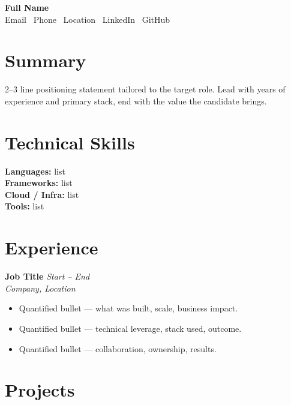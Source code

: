 \documentclass[10pt,letterpaper]{article}
\begin{document}
\begin{center}
  {\LARGE \textbf{Full Name}}\\[3pt]
  {\small Email \textbar\ Phone \textbar\ Location \textbar\ LinkedIn \textbar\ GitHub}
\end{center}

\vspace{2pt}

\section*{Summary}
2--3 line positioning statement tailored to the target role. Lead with years
of experience and primary stack, end with the value the candidate brings.

\section*{Technical Skills}
\textbf{Languages:} list \\
\textbf{Frameworks:} list \\
\textbf{Cloud / Infra:} list \\
\textbf{Tools:} list

\section*{Experience}

\textbf{Job Title} \hfill \textit{Start -- End} \\
\textit{Company, Location}
\begin{itemize}
  \item Quantified bullet — what was built, scale, business impact.
  \item Quantified bullet — technical leverage, stack used, outcome.
  \item Quantified bullet — collaboration, ownership, results.
\end{itemize}


\section*{Projects}
\end{document}

